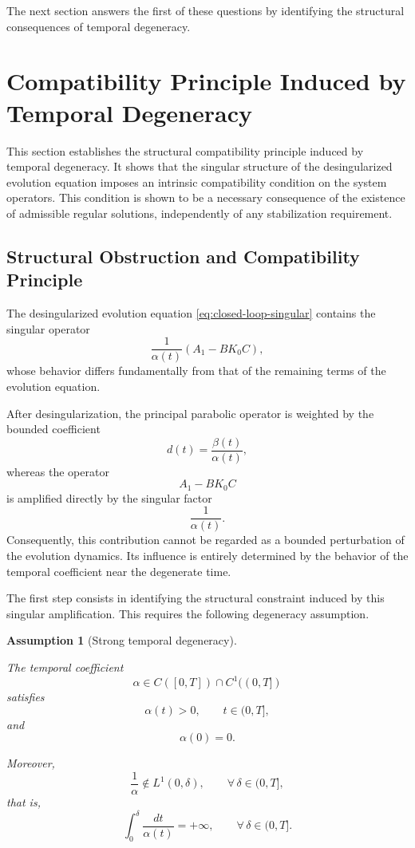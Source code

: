 \documentclass[pdflatex,sn-mathphys-num]{sn-jnl}
\theoremstyle{thmstyleone}%
\theoremstyle{thmstyletwo}%
\theoremstyle{thmstylethree}%
\newtheorem{assumption}{Assumption}
\begin{document}
The next section answers the first of these questions by identifying the structural consequences of temporal degeneracy.

\section{Compatibility Principle Induced by Temporal Degeneracy}
\label{sec:compatibility}

This section establishes the structural compatibility principle induced by temporal degeneracy. It shows that the singular structure of the desingularized evolution equation imposes an intrinsic compatibility condition on the system operators. This condition is shown to be a necessary consequence of the existence of admissible regular solutions, independently of any stabilization requirement.

\subsection{Structural Obstruction and Compatibility Principle}
\label{subsec:compatibility-principle}

The desingularized evolution equation \eqref{eq:closed-loop-singular} contains the singular operator
\[
\frac{1}{\alpha(t)}
\left(
A_{1}-BK_{0}C
\right),
\]
whose behavior differs fundamentally from that of the remaining terms of the evolution equation.

After desingularization, the principal parabolic operator is weighted by the bounded coefficient
\[
d(t)=\frac{\beta(t)}{\alpha(t)},
\]
whereas the operator
\[
A_{1}-BK_{0}C
\]
is amplified directly by the singular factor
\[
\frac{1}{\alpha(t)}.
\]
Consequently, this contribution cannot be regarded as a bounded perturbation of the evolution dynamics. Its influence is entirely determined by the behavior of the temporal coefficient near the degenerate time.

The first step consists in identifying the structural constraint induced by this singular amplification. This requires the following degeneracy assumption.

\begin{assumption}[Strong temporal degeneracy]
\label{ass:strong-degeneracy}

The temporal coefficient
\[
\alpha\in C([0,T])\cap C^{1}((0,T])
\]
satisfies
\[
\alpha(t)>0,
\qquad
t\in(0,T],
\]
and
\[
\alpha(0)=0.
\]

Moreover,
\[
\frac{1}{\alpha}
\notin
L^{1}(0,\delta),
\qquad
\forall\,\delta\in(0,T],
\]
that is,
\begin{equation}
\int_{0}^{\delta}
\frac{dt}{\alpha(t)}
=
+\infty,
\qquad
\forall\,\delta\in(0,T].
\label{eq:strong-degeneracy}
\end{equation}

\end{assumption}
\end{document}
